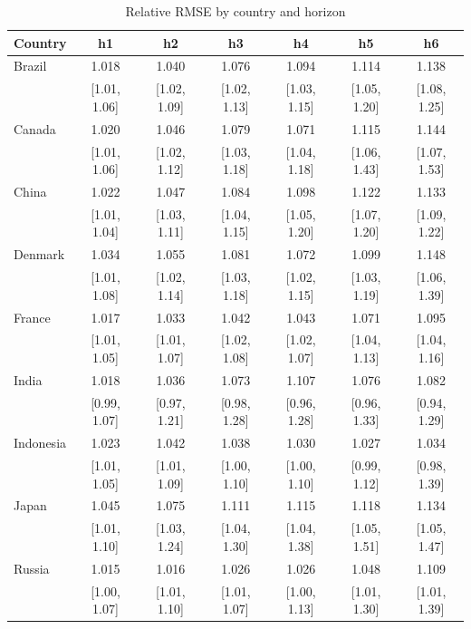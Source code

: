 \begin{table}[htbp]
\centering
\caption{Relative RMSE by country and horizon}
\label{tab:relrmse_country_horizon}
{\fontsize{8}{10}\selectfont\setlength{\tabcolsep}{3pt}
\begin{tabular*}{\textwidth}{@{\extracolsep{\fill}}lcccccc}
\toprule
Country & h1 & h2 & h3 & h4 & h5 & h6 \\
\midrule
Brazil & 1.018 & 1.040 & 1.076 & 1.094 & 1.114 & 1.138 \\
 & [1.01, 1.06] & [1.02, 1.09] & [1.02, 1.13] & [1.03, 1.15] & [1.05, 1.20] & [1.08, 1.25] \\
\addlinespace
Canada & 1.020 & 1.046 & 1.079 & 1.071 & 1.115 & 1.144 \\
 & [1.01, 1.06] & [1.02, 1.12] & [1.03, 1.18] & [1.04, 1.18] & [1.06, 1.43] & [1.07, 1.53] \\
\addlinespace
China & 1.022 & 1.047 & 1.084 & 1.098 & 1.122 & 1.133 \\
 & [1.01, 1.04] & [1.03, 1.11] & [1.04, 1.15] & [1.05, 1.20] & [1.07, 1.20] & [1.09, 1.22] \\
\addlinespace
Denmark & 1.034 & 1.055 & 1.081 & 1.072 & 1.099 & 1.148 \\
 & [1.01, 1.08] & [1.02, 1.14] & [1.03, 1.18] & [1.02, 1.15] & [1.03, 1.19] & [1.06, 1.39] \\
\addlinespace
France & 1.017 & 1.033 & 1.042 & 1.043 & 1.071 & 1.095 \\
 & [1.01, 1.05] & [1.01, 1.07] & [1.02, 1.08] & [1.02, 1.07] & [1.04, 1.13] & [1.04, 1.16] \\
\addlinespace
India & 1.018 & 1.036 & 1.073 & 1.107 & 1.076 & 1.082 \\
 & [0.99, 1.07] & [0.97, 1.21] & [0.98, 1.28] & [0.96, 1.28] & [0.96, 1.33] & [0.94, 1.29] \\
\addlinespace
Indonesia & 1.023 & 1.042 & 1.038 & 1.030 & 1.027 & 1.034 \\
 & [1.01, 1.05] & [1.01, 1.09] & [1.00, 1.10] & [1.00, 1.10] & [0.99, 1.12] & [0.98, 1.39] \\
\addlinespace
Japan & 1.045 & 1.075 & 1.111 & 1.115 & 1.118 & 1.134 \\
 & [1.01, 1.10] & [1.03, 1.24] & [1.04, 1.30] & [1.04, 1.38] & [1.05, 1.51] & [1.05, 1.47] \\
\addlinespace
Russia & 1.015 & 1.016 & 1.026 & 1.026 & 1.048 & 1.109 \\
 & [1.00, 1.07] & [1.01, 1.10] & [1.01, 1.07] & [1.00, 1.13] & [1.01, 1.30] & [1.01, 1.39] \\

\end{tabular*}}
\end{table}
